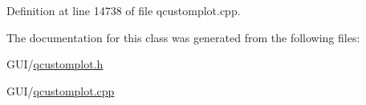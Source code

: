 Definition at line 14738 of file qcustomplot.\+cpp.



The documentation for this class was generated from the following files\+:\begin{DoxyCompactItemize}
\item 
G\+U\+I/\hyperlink{qcustomplot_8h}{qcustomplot.\+h}\item 
G\+U\+I/\hyperlink{qcustomplot_8cpp}{qcustomplot.\+cpp}\end{DoxyCompactItemize}

